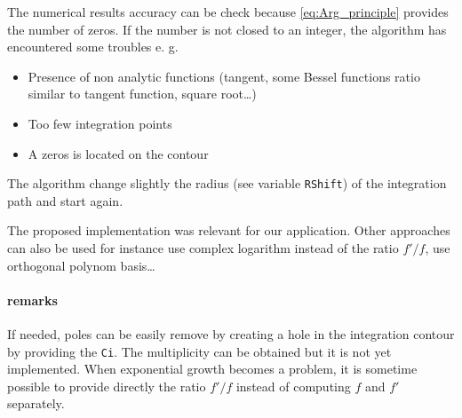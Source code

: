 \documentclass[a4paper,10pt]{article}
\begin{document}

%





The numerical results accuracy can be check because \eqref{eq:Arg_principle} provides the number of zeros. If the number is not closed to an integer, the algorithm has encountered some troubles e. g. 
\begin{itemize}
\item Presence of non analytic functions (tangent, some Bessel functions ratio similar to tangent function, square root\dots)
\item Too few integration points
\item A zeros is located on the contour
\end{itemize}
The algorithm change slightly the radius (see variable \texttt{RShift}) of the integration path and start again.

The proposed implementation was relevant for our application. Other approaches can also be used for instance use complex logarithm instead of the ratio $f'/f$, use orthogonal polynom basis\dots


\paragraph{remarks}
If needed, poles can be easily remove by creating a hole in the integration contour by providing the \texttt{Ci}. The multiplicity can be obtained but it is not yet implemented. When exponential growth becomes a problem, it is sometime possible to provide directly the ratio $f'/f$ instead of computing $f$ and $f'$ separately.
\end{document}
